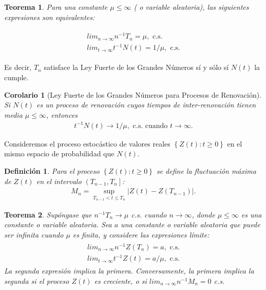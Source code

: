 \documentclass{article}
\newtheorem{Def}{Definición}[section]
\newtheorem{Teo}{Teorema}%
\newtheorem{Cor}{Corolario}%
\numberwithin{equation}{section}
\begin{document}
\begin{Teo}
Para una constante $\mu\leq\infty$ ( o variable aleatoria), las siguientes expresiones son equivalentes:

\begin{eqnarray}
\begin{array}{l}
lim_{n\rightarrow\infty}n^{-1}T_{n}=\mu,\textrm{ c.s.}\\
lim_{t\rightarrow\infty}t^{-1}N\left(t\right)=1/\mu,\textrm{ c.s.}
\end{array}
\end{eqnarray}
\end{Teo}

Es decir, $T_{n}$ satisface la Ley Fuerte de los Grandes N\'umeros s\'i y s\'olo s\'i $N\left(t\right)$ la cumple.

\begin{Cor}[Ley Fuerte de los Grandes N\'umeros para Procesos de Renovaci\'on]
Si $N\left(t\right)$ es un proceso de renovaci\'on cuyos tiempos de inter-renovaci\'on tienen media $\mu\leq\infty$, entonces
\begin{eqnarray}
t^{-1}N\left(t\right)\rightarrow 1/\mu,\textrm{ c.s. cuando }t\rightarrow\infty.
\end{eqnarray}
\end{Cor}

Consideremos el proceso estoc\'astico de valores reales $\left\{Z\left(t\right):t\geq0\right\}$ en el mismo espacio de probabilidad que $N\left(t\right)$.

\begin{Def}
Para el proceso $\left\{Z\left(t\right):t\geq0\right\}$ se define la fluctuaci\'on m\'axima de $Z\left(t\right)$ en el intervalo $\left(T_{n-1},T_{n}\right]$:
\begin{eqnarray*}
M_{n}=\sup_{T_{n-1}<t\leq T_{n}}|Z\left(t\right)-Z\left(T_{n-1}\right)|.
\end{eqnarray*}
\end{Def}

\begin{Teo}
Sup\'ongase que $n^{-1}T_{n}\rightarrow\mu$ c.s. cuando $n\rightarrow\infty$, donde $\mu\leq\infty$ es una constante o variable aleatoria. Sea $a$ una constante o variable aleatoria que puede ser infinita cuando $\mu$ es finita, y considere las expresiones l\'imite:
\begin{eqnarray}
\begin{array}{l}
lim_{n\rightarrow\infty}n^{-1}Z\left(T_{n}\right)=a,\textrm{ c.s.}\\
lim_{t\rightarrow\infty}t^{-1}Z\left(t\right)=a/\mu,\textrm{ c.s.}
\end{array}
\end{eqnarray}
La segunda expresi\'on implica la primera. Conversamente, la primera implica la segunda si el proceso $Z\left(t\right)$ es creciente, o si $lim_{n\rightarrow\infty}n^{-1}M_{n}=0$ c.s.
\end{Teo}
\end{document}
